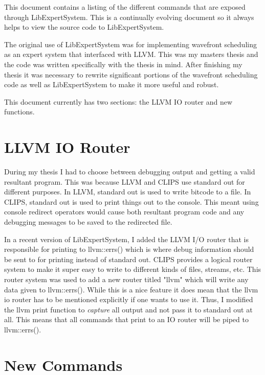 \documentclass[11pt]{article}
\begin{document}
This document contains a listing of the different commands that are exposed
through LibExpertSystem. This is a continually evolving document so it always
helps to view the source code to LibExpertSystem. 

The original use of LibExpertSystem was for implementing wavefront scheduling
as an expert system that interfaced with LLVM. This was my masters thesis and
the code was written specifically with the thesis in mind. After finishing my
thesis it was necessary to rewrite significant portions of the wavefront
scheduling code as well as LibExpertSystem to make it more useful and robust. 

This document currently has two sections: the LLVM IO router and new functions.


\section*{LLVM IO Router}
During my thesis I had to choose between debugging output and getting a valid
resultant program. This was because LLVM and CLIPS use standard out for
different purposes. In LLVM, standard out is used to write bitcode to a file.
In CLIPS, standard out is used to print things out to the console. This meant
using console redirect operators would cause both resultant program code and
any debugging messages to be saved to the redirected file. 

In a recent version of LibExpertSystem, I added the LLVM I/O router that is
responsible for printing to llvm::errs() which is where debug information
should be sent to for printing instead of standard out. CLIPS provides a
logical router system to make it super easy to write to different kinds of
files, streams, etc. This router system was used to add a new router titled
"llvm" which will write any data given to llvm::errs(). While this is a nice
feature it does mean that the llvm io router has to be mentioned explicitly if
one wants to use it. Thus, I modified the llvm print function to \emph{capture}
all output and not pass it to standard out at all. This means that all commands
that print to an IO router will be piped to llvm::errs(). 

\section*{New Commands}
\end{document}
